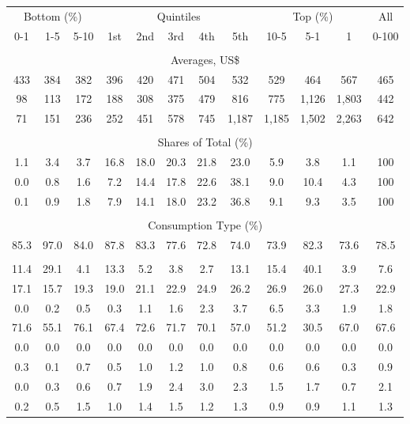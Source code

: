 \begin{tabular}{c c c| c c c c c| c c c| c}
\toprule
\multicolumn{3}{c|}{Bottom (\%)} & \multicolumn{5}{c|}{Quintiles} & \multicolumn{3}{c|}{Top (\%)} & All  \\
0-1 & 1-5 & 5-10 &  1st & 2nd & 3rd & 4th & 5th & 10-5 & 5-1 & 1 & 0-100 \\
\midrule \\
\multicolumn{12}{c}{Averages, US\$} \\
\midrule
433  & 384  & 382  & 396  & 420  & 471  & 504  & 532  & 529  & 464  & 567  & 465 \\
98 & 113 & 172 & 188 & 308 & 375 & 479 & 816 & 775 & 1,126 & 1,803 & 442 \\
71 & 151 & 236 & 252 & 451 & 578 & 745 & 1,187 & 1,185 & 1,502 & 2,263 & 642 \\
\midrule \\
\multicolumn{12}{c}{Shares of Total (\%)} \\
\midrule
1.1   & 3.4   & 3.7   & 16.8   & 18.0   & 20.3   & 21.8   & 23.0   & 5.9   & 3.8   & 1.1   & 100 \\
0.0  & 0.8  & 1.6  & 7.2  & 14.4  & 17.8  & 22.6  & 38.1  & 9.0  & 10.4  & 4.3  & 100 \\
0.1  & 0.9  & 1.8  & 7.9  & 14.1  & 18.0  & 23.2  & 36.8  & 9.1  & 9.3  & 3.5  & 100 \\
\midrule \\
\multicolumn{12}{c}{Consumption Type (\%)}  \\
\midrule
85.3 & 97.0 & 84.0 & 87.8 & 83.3 & 77.6 & 72.8 & 74.0 & 73.9 & 82.3 & 73.6 & 78.5 \\
 & & & & & & & & & & &  \\
11.4 & 29.1 & 4.1 & 13.3 & 5.2 & 3.8 & 2.7 & 13.1 & 15.4 & 40.1 & 3.9 & 7.6 \\
17.1 & 15.7 & 19.3 & 19.0 & 21.1 & 22.9 & 24.9 & 26.2 & 26.9 & 26.0 & 27.3 & 22.9 \\
0.0 & 0.2 & 0.5 & 0.3 & 1.1 & 1.6 & 2.3 & 3.7 & 6.5 & 3.3 & 1.9 & 1.8 \\
71.6 & 55.1 & 76.1 & 67.4 & 72.6 & 71.7 & 70.1 & 57.0 & 51.2 & 30.5 & 67.0 & 67.6 \\
0.0 & 0.0 & 0.0 & 0.0 & 0.0 & 0.0 & 0.0 & 0.0 & 0.0 & 0.0 & 0.0 & 0.0 \\
0.3 & 0.1 & 0.7 & 0.5 & 1.0 & 1.2 & 1.0 & 0.8 & 0.6 & 0.6 & 0.3 & 0.9 \\
0.0 & 0.3 & 0.6 & 0.7 & 1.9 & 2.4 & 3.0 & 2.3 & 1.5 & 1.7 & 0.7 & 2.1 \\
0.2 & 0.5 & 1.5 & 1.0 & 1.4 & 1.5 & 1.2 & 1.3 & 0.9 & 0.9 & 1.1 & 1.3 \\

\end{tabular}
